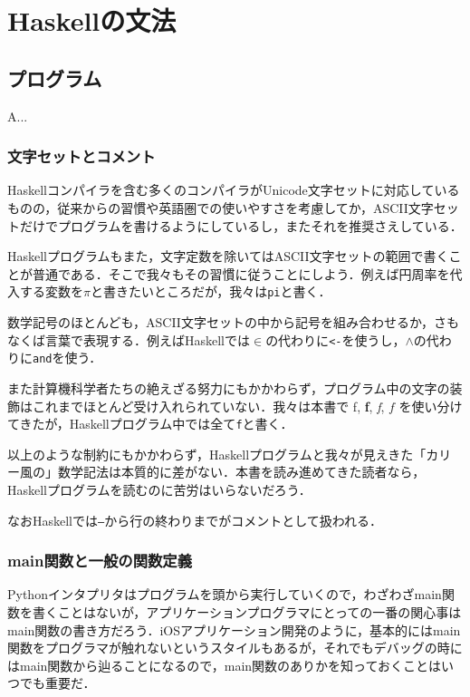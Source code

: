 \documentclass[a5paper,draft]{jsbook}
\newcommand{\programminglanguage}[1]{\textsf{#1}}
\newcommand{\haskell}{\programminglanguage{Haskell}}
\newcommand{\python}{\programminglanguage{Python}}
\newenvironment{leader}{\begingroup}{\endgroup}
\newcommand{\code}[1]{\texttt{#1}}
\begin{document}
\part{\haskell の文法}

\chapter{プログラム}

\begin{leader}
A...
\end{leader}


\section{文字セットとコメント}

\haskell コンパイラを含む多くのコンパイラがUnicode文字セットに対応しているものの，従来からの習慣や英語圏での使いやすさを考慮してか，ASCII文字セットだけでプログラムを書けるようにしているし，またそれを推奨さえしている．

\haskell プログラムもまた，文字定数を除いてはASCII文字セットの範囲で書くことが普通である．そこで我々もその習慣に従うことにしよう．例えば円周率を代入する変数を$\pi$と書きたいところだが，我々は\code{pi}と書く．

数学記号のほとんども，ASCII文字セットの中から記号を組み合わせるか，さもなくば言葉で表現する．例えば\haskell では$\in$の代わりに\code{<-}を使うし，$\wedge$の代わりに\code{and}を使う．

また計算機科学者たちの絶えざる努力にもかかわらず，プログラム中の文字の装飾はこれまでほとんど受け入れられていない．我々は本書で \textrm{f}, \textbf{f}, \textit{f}, $f$ を使い分けてきたが，\haskell プログラム中では全て\code{f}と書く．

以上のような制約にもかかわらず，\haskell プログラムと我々が見えきた「カリー風の」数学記法は本質的に差がない．本書を読み進めてきた読者なら，\haskell プログラムを読むのに苦労はいらないだろう．

なお\haskell では\code{--}から行の終わりまでがコメントとして扱われる．

\section{main関数と一般の関数定義}

\python インタプリタはプログラムを頭から実行していくので，わざわざmain関数を書くことはないが，アプリケーションプログラマにとっての一番の関心事はmain関数の書き方だろう．iOSアプリケーション開発のように，基本的にはmain関数をプログラマが触れないというスタイルもあるが，それでもデバッグの時にはmain関数から辿ることになるので，main関数のありかを知っておくことはいつでも重要だ．
\end{document}
